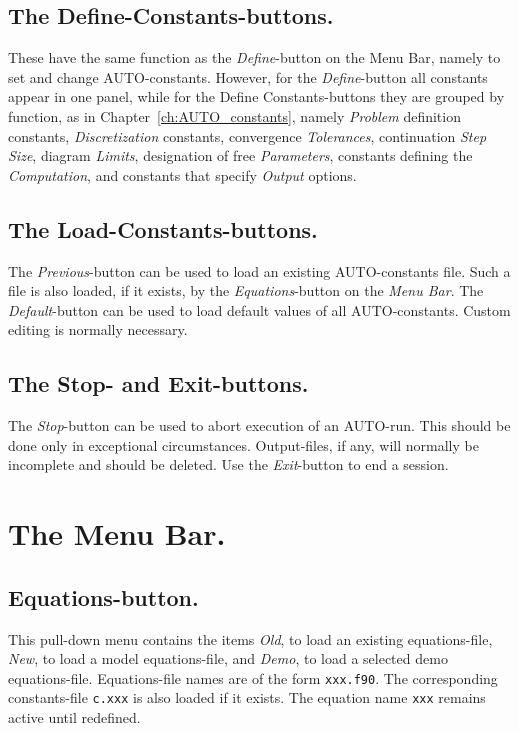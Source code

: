 \documentclass[12pt]{report}
\begin{document}
\subsection{ The Define-Constants-buttons.}
These have the same function as
the {\it Define}-button on the  Menu Bar, namely to set and change
{\cal AUTO}-constants.
However, 
for the {\it Define}-button all constants appear in one panel, 
while 
for the Define Constants-buttons they
are grouped by function, 
as in Chapter~\ref{ch:AUTO_constants}, namely
{\it Problem} definition constants,
{\it Discretization} constants,
convergence {\it Tolerances},
continuation {\it Step Size},
diagram {\it Limits},
designation of free {\it Parameters},
constants defining the {\it Computation},
and
constants that specify {\it Output} options.


\subsection{ The Load-Constants-buttons.}
The {\it Previous}-button can be used to load an existing {\cal AUTO}-constants file.
Such a file is also loaded, if it exists,
by the {\it Equations}-button on the {\it Menu Bar}.
The {\it Default}-button can be used
to load  default values of all {\cal AUTO}-constants. 
Custom editing is normally necessary.


\subsection{ The Stop- and Exit-buttons.}
The {\it Stop}-button can be used to abort execution of an {\cal AUTO}-run.
This should be done only in exceptional circumstances.
Output-files, if any, will normally be incomplete and should be deleted.
Use the {\it Exit}-button to end a session.


\section{ The Menu Bar.} \label{sec:GUI_Menu_bar}
\subsection{ Equations-button.}
This pull-down menu contains the items
{\it Old}, to load an existing equations-file,
{\it New}, to load a model equations-file,
and
{\it Demo}, to load a selected demo equations-file.
Equations-file names are of the form {\tt xxx.f90}.
The corresponding constants-file {\tt c.xxx} is also loaded if it exists.
The equation name {\tt xxx} remains active until redefined.
\end{document}
